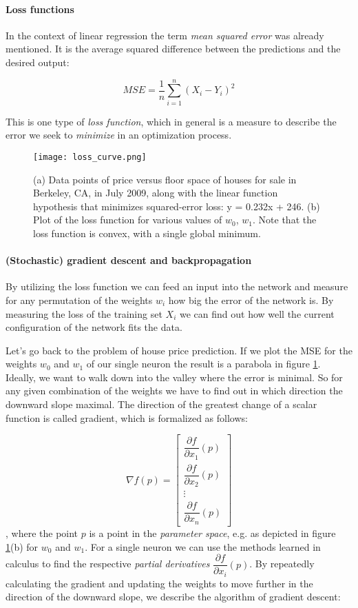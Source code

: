 \paragraph{Loss functions} In the context of linear regression the term \textit{mean squared error} was already mentioned. It is the average squared difference between the predictions and the desired output:

$$
    MSE = \frac{1}{n} \sum_{i = 1}^{n}(X_i - Y_i)^2
$$

This is one type of \textit{loss function}, which in general is a measure to describe the error we seek to \textit{minimize} in an optimization process.

\begin{figure}
    \centering
    \texttt{[image: loss\_curve.png]}
    \caption{(a) Data points of price versus floor space of houses for sale in Berkeley, CA, in July 2009, along with the linear function hypothesis that minimizes squared-error loss: y = 0.232x + 246. (b) Plot of the loss function for various values of $ w_0 $, $ w_1 $. Note that the loss function is convex, with a single global minimum. \cite[p. 1251]{russell_artificial_2021}}
    \label{loss_curve}
\end{figure}

\paragraph{(Stochastic) gradient descent and backpropagation} By utilizing the loss function we can feed an input into the network and measure for any permutation of the weights $ w_i $ how big the error of the network is. By measuring the loss of the training set $ X_i $ we can find out how well the current configuration of the network fits the data.

Let's go back to the problem of house price prediction. If we plot the MSE for the weights $ w_0 $ and $ w_1 $ of our single neuron the result is a parabola in figure \ref{loss_curve}. Ideally, we want to walk down into the valley where the error is minimal. So for any given combination of the weights we have to find out in which direction the downward slope maximal. The direction of the greatest change of a scalar function is called gradient, which is formalized as follows:

$$
    \nabla f(p)=\left[\begin{array}{c}
            \dfrac{\partial f}{\partial x_1}(p) \\
            \dfrac{\partial f}{\partial x_2}(p) \\
            \vdots                              \\
            \dfrac{\partial f}{\partial x_n}(p)
        \end{array}\right]
$$,
where the point $p $ is a point in the \textit{parameter space}, e.g. as depicted in figure \ref{loss_curve}(b) for $w_0 $ and $ w_1 $. For a single neuron we can use the methods learned in calculus to find the respective \textit{partial derivatives} $  \dfrac{\partial f}{\partial x_i}(p) $. By repeatedly calculating the gradient and updating the weights to move further in the direction of the downward slope, we describe the algorithm of gradient descent:

